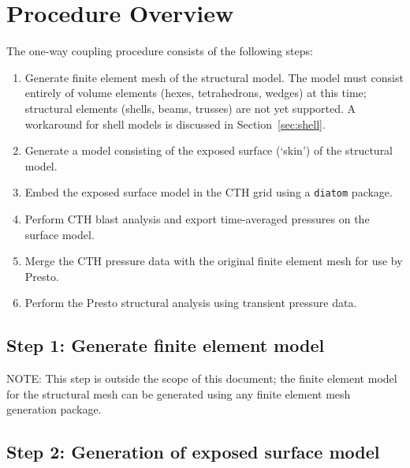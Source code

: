 \documentclass[11pt,twoside]{article}
\newcommand{\cmd}[1]
   {\mbox{\tt #1}\null}
\begin{document}
\section{Procedure Overview}
The one{}-way coupling procedure consists of the following steps:
\begin{enumerate}
\item
Generate finite element mesh of the structural model. The model must
consist entirely of volume elements (hexes, tetrahedrons, wedges) at
this time; structural elements (shells, beams, trusses) are not yet
supported. A workaround for shell models is discussed in Section~\ref{sec:shell}. 

\item Generate a model consisting of the exposed surface (`skin') of the
structural model.

\item Embed the exposed surface model in the CTH grid using a \cmd{diatom} package.

\item Perform CTH blast analysis and export time{}-averaged pressures on the
surface model.

\item Merge the CTH pressure data with the original finite element mesh for
use by Presto.

\item Perform the Presto structural analysis using transient pressure data.
\end{enumerate}

\subsection{Step 1: Generate finite element model}
NOTE: This step is outside the scope of this document; the finite
element model for the structural mesh can be generated using any
finite element mesh generation package.


\subsection{Step 2:  Generation of exposed surface model}\label{sec:surfmodel}
\end{document}
